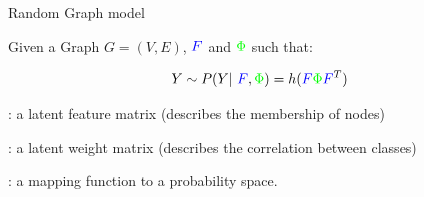 \begin{frame}[t]{Random Graph model}

Given a Graph $G=(V,E)$,  $\textcolor{blue}{F}$ and $\textcolor{green}{\Phi}$ such that:

\begin{equation*}
    Y \sim P(Y | \textcolor{blue}{F}, \textcolor{green}{\Phi}) =h( \textcolor{blue}{F}\textcolor{green}{\Phi} \textcolor{blue}{F}^T )
\end{equation*}


\begin{description}
\setlength{\itemindent}{-2cm}
\item[\textcolor{blue}{$F$}]: a latent feature matrix (describes the membership of nodes)
\item[\textcolor{green}{$\Phi$}]: a latent weight matrix (describes the correlation between classes)
\item[$h$]: a mapping function to a probability space.
\end{description}

\pause


    \begin{columns}
        \begin{column}{0.6\textwidth}
            


\end{column}
\end{columns}
\end{frame}
